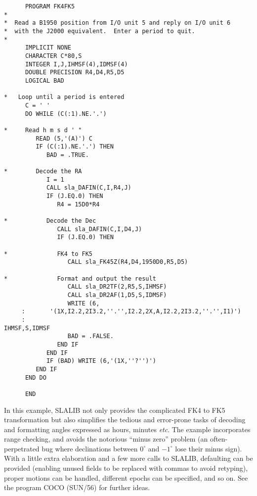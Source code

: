 \begin{verbatim}
      PROGRAM FK4FK5
*
*  Read a B1950 position from I/O unit 5 and reply on I/O unit 6
*  with the J2000 equivalent.  Enter a period to quit.
*
      IMPLICIT NONE
      CHARACTER C*80,S
      INTEGER I,J,IHMSF(4),IDMSF(4)
      DOUBLE PRECISION R4,D4,R5,D5
      LOGICAL BAD

*   Loop until a period is entered
      C = ' '
      DO WHILE (C(:1).NE.'.')

*     Read h m s d ' "
         READ (5,'(A)') C
         IF (C(:1).NE.'.') THEN
            BAD = .TRUE.

*        Decode the RA
            I = 1
            CALL sla_DAFIN(C,I,R4,J)
            IF (J.EQ.0) THEN
               R4 = 15D0*R4

*           Decode the Dec
               CALL sla_DAFIN(C,I,D4,J)
               IF (J.EQ.0) THEN

*              FK4 to FK5
                  CALL sla_FK45Z(R4,D4,1950D0,R5,D5)

*              Format and output the result
                  CALL sla_DR2TF(2,R5,S,IHMSF)
                  CALL sla_DR2AF(1,D5,S,IDMSF)
                  WRITE (6,
     :       '(1X,I2.2,2I3.2,''.'',I2.2,2X,A,I2.2,2I3.2,''.'',I1)')
     :                                                     IHMSF,S,IDMSF
                  BAD = .FALSE.
               END IF
            END IF
            IF (BAD) WRITE (6,'(1X,''?'')')
         END IF
      END DO

      END
\end{verbatim}
In this example, SLALIB not only provides the complicated FK4 to
FK5 transformation but also
simplifies the tedious and error-prone tasks
of decoding and formatting angles
expressed as hours, minutes {\it etc}.  The
example incorporates range checking, and avoids the
notorious ``minus zero'' problem (an often-perpetrated bug where
declinations between $0^{\circ}$ and $-1^{\circ}$ lose their minus
sign).
With a little extra elaboration and a few more calls to SLALIB,
defaulting can be provided (enabling unused fields to
be replaced with commas to avoid retyping), proper motions
can be handled, different epochs can be specified, and
so on.  See the program COCO (SUN/56) for further ideas.

